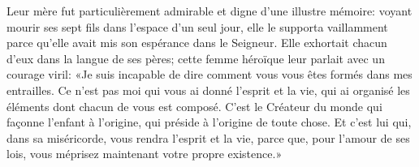 Leur mère fut particulièrement admirable et digne d’une illustre mémoire:
	voyant mourir ses sept fils dans l’espace d’un seul jour,
	elle le supporta vaillamment parce qu’elle avait mis son espérance dans le Seigneur.
Elle exhortait chacun d’eux dans la langue de ses pères;
	cette femme héroïque leur parlait avec un courage viril:
	«Je suis incapable de dire comment vous vous êtes formés dans mes entrailles.
	Ce n’est pas moi qui vous ai donné l’esprit et la vie,
	qui ai organisé les éléments dont chacun de vous est composé.
C’est le Créateur du monde qui façonne l’enfant à l’origine,
	qui préside à l’origine de toute chose.
Et c’est lui qui, dans sa miséricorde, vous rendra l’esprit et la vie,
	parce que, pour l’amour de ses lois,
	vous méprisez maintenant votre propre existence.»
